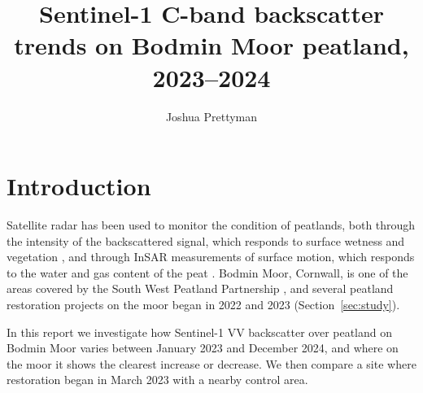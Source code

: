 \documentclass[10pt,a4paper,twocolumn]{article}
\title{\vspace{-1.2cm}\Large\bfseries Sentinel-1 C-band backscatter trends on Bodmin Moor peatland, 2023--2024}
\author{Joshua Prettyman}
\date{}
\begin{document}

\section{Introduction}
Satellite radar has been used to monitor the condition of peatlands, both through the intensity of the backscattered signal, which responds to surface wetness and vegetation \cite{toca2023potential,asmuss2019potential,hrysiewicz2023sar}, and through InSAR measurements of surface motion, which responds to the water and gas content of the peat \cite{marshall2021naturescot,bradley2022identification}.
Bodmin Moor, Cornwall, is one of the areas covered by the South West Peatland Partnership \cite{swpp}, and several peatland restoration projects on the moor began in 2022 and 2023 (Section~\ref{sec:study}).

In this report we investigate how Sentinel-1 VV backscatter over peatland on Bodmin Moor varies between January 2023 and December 2024, and where on the moor it shows the clearest increase or decrease.
We then compare a site where restoration began in March 2023 with a nearby control area.
\end{document}
